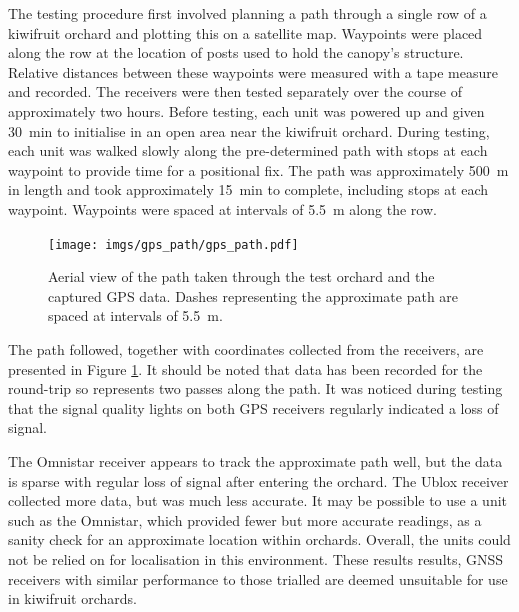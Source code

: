 \documentclass[preprint,authoryear,12pt]{elsarticle}
\begin{document}
        The testing procedure first involved planning a path through a single row of a kiwifruit orchard and plotting this on a satellite map.
        Waypoints were placed along the row at the location of posts used to hold the canopy's structure.
        Relative distances between these waypoints were measured with a tape measure and recorded.
        The receivers were then tested separately over the course of approximately two hours.
        Before testing, each unit was powered up and given \SI{30}{\minute} to initialise in an open area near the kiwifruit orchard.
        During testing, each unit was walked slowly along the pre-determined path with stops at each waypoint to provide time for a positional fix.
        The path was approximately \SI{500}{\meter} in length and took approximately \SI{15}{\minute} to complete, including stops at each waypoint.
        Waypoints were spaced at intervals of \SI{5.5}{\meter} along the row.

        \begin{figure}[htb]
            \centering
            \texttt{[image: imgs/gps\_path/gps\_path.pdf]}
            \caption{
                Aerial view of the path taken through the test orchard and the captured GPS data.
                Dashes representing the approximate path are spaced at intervals of \SI{5.5}{\meter}.
            }
            \label{fig:gpsResults}
        \end{figure}

        The path followed, together with coordinates collected from the receivers, are presented in Figure \ref{fig:gpsResults}.
        It should be noted that data has been recorded for the round-trip so represents two passes along the path.
        It was noticed during testing that the signal quality lights on both GPS receivers regularly indicated a loss of signal.

        The Omnistar receiver appears to track the approximate path well, but the data is sparse with regular loss of signal after entering the orchard.
    	The Ublox receiver collected more data, but was much less accurate.
        It may be possible to use a unit such as the Omnistar, which provided fewer but more accurate readings, as a sanity check for an approximate location within orchards.
        Overall, the units could not be relied on for localisation in this environment.
        These results results, GNSS receivers with similar performance to those trialled are deemed unsuitable for use in kiwifruit orchards.
\end{document}
